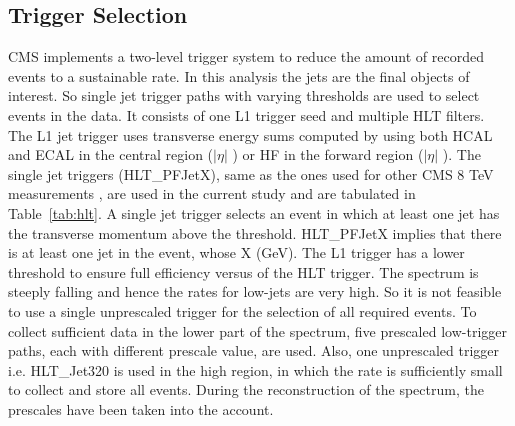 \subsection{Trigger Selection}

CMS implements a two-level trigger system to reduce the amount of recorded events to a sustainable rate. In this analysis the jets are the final objects of interest. So single jet trigger paths with varying thresholds are used to select events in the data. It consists of one L1 trigger seed and multiple HLT filters. The L1 jet trigger uses transverse energy sums computed by using both HCAL and ECAL in the central region ($|\eta|$ ) or HF in the forward region ($|\eta|$ ). The single jet triggers (HLT\_PFJetX), same as the ones used for other CMS 8 TeV measurements \cite{Khachatryan:2016mlc,Sirunyan:2017skj}, are used in the current study and are tabulated in Table~\ref{tab:hlt}. A single jet trigger selects an event in which at least one jet has the transverse momentum above the threshold. HLT\_PFJetX implies that there is at least one jet in the event, whose \pt \gr X (GeV). The L1 trigger has a lower threshold to ensure full efficiency versus \pt of the HLT trigger. The \pt spectrum is steeply falling and hence the rates for low-\pt jets are very high. So it is not feasible to use a single unprescaled trigger for the selection of all required events. To collect sufficient data in the lower part of the \pt spectrum, five prescaled low-\pt trigger paths, each with different prescale value, are used. Also, one unprescaled trigger i.e. HLT\_Jet320 is used in the high \pt region, in which the rate is sufficiently small to collect and store all events. During the reconstruction of the spectrum, the prescales have been taken into the account.


